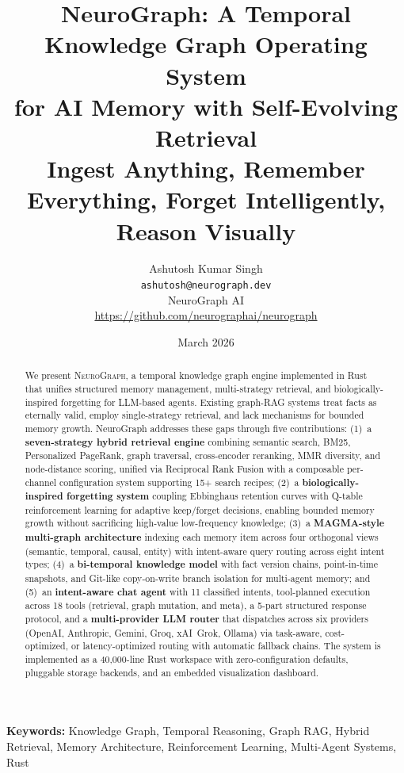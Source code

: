 \documentclass[11pt,a4paper,twocolumn]{article}
\title{%
  \textbf{NeuroGraph: A Temporal Knowledge Graph Operating System\\
  for AI Memory with Self-Evolving Retrieval}\\[6pt]
  \large Ingest Anything, Remember Everything, Forget Intelligently, Reason Visually
}
\author{
  Ashutosh Kumar Singh\\
  \texttt{ashutosh@neurograph.dev}\\
  NeuroGraph AI\\
  \url{https://github.com/neurographai/neurograph}
}
\date{March 2026}
\begin{document}
\maketitle

\begin{abstract}
We present \textsc{NeuroGraph}, a temporal knowledge graph engine
implemented in Rust that unifies structured memory management,
multi-strategy retrieval, and biologically-inspired forgetting
for LLM-based agents. Existing graph-RAG systems treat facts as
eternally valid, employ single-strategy retrieval, and lack
mechanisms for bounded memory growth. NeuroGraph addresses these
gaps through five contributions:
(1)~a \textbf{seven-strategy hybrid retrieval engine} combining
semantic search, BM25, Personalized PageRank, graph traversal,
cross-encoder reranking, MMR diversity, and node-distance scoring,
unified via Reciprocal Rank Fusion with a composable per-channel
configuration system supporting 15+ search recipes;
(2)~a \textbf{biologically-inspired forgetting system} coupling
Ebbinghaus retention curves with Q-table reinforcement learning
for adaptive keep/forget decisions, enabling bounded memory growth
without sacrificing high-value low-frequency knowledge;
(3)~a \textbf{MAGMA-style multi-graph architecture} indexing each
memory item across four orthogonal views (semantic, temporal,
causal, entity) with intent-aware query routing across eight
intent types;
(4)~a \textbf{bi-temporal knowledge model} with fact version
chains, point-in-time snapshots, and Git-like copy-on-write branch
isolation for multi-agent memory; and
(5)~an \textbf{intent-aware chat agent} with 11 classified
intents, tool-planned execution across 18 tools (retrieval,
graph mutation, and meta), a 5-part structured response protocol,
and a \textbf{multi-provider LLM router} that dispatches across
six providers (OpenAI, Anthropic, Gemini, Groq, xAI~Grok, Ollama)
via task-aware, cost-optimized, or latency-optimized routing
with automatic fallback chains.
The system is implemented as a 40,000-line Rust workspace with
zero-configuration defaults, pluggable storage backends, and an
embedded visualization dashboard.
\end{abstract}

\textbf{Keywords:} Knowledge Graph, Temporal Reasoning, Graph RAG,
Hybrid Retrieval, Memory Architecture, Reinforcement Learning,
Multi-Agent Systems, Rust

\end{document}
